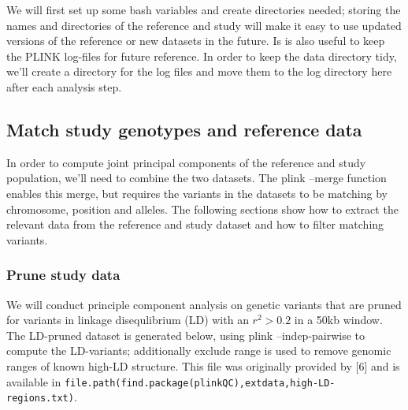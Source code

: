 \documentclass[]{article}
\newenvironment{Shaded}{}{}
\newcommand{\StringTok}[1]{\textcolor[rgb]{0.25,0.44,0.63}{#1}}
\newcommand{\FunctionTok}[1]{\textcolor[rgb]{0.02,0.16,0.49}{#1}}
\newcommand{\VariableTok}[1]{\textcolor[rgb]{0.10,0.09,0.49}{#1}}
\newcommand{\NormalTok}[1]{#1}
\begin{document}
We will first set up some bash variables and create directories needed;
storing the names and directories of the reference and study will make
it easy to use updated versions of the reference or new datasets in the
future. Is is also useful to keep the PLINK log-files for future
reference. In order to keep the data directory tidy, we'll create a
directory for the log files and move them to the log directory here
after each analysis step.

\begin{Shaded}
\end{Shaded}

\subsection{Match study genotypes and reference
data}\label{match-study-genotypes-and-reference-data}

In order to compute joint principal components of the reference and
study population, we'll need to combine the two datasets. The plink
--merge function enables this merge, but requires the variants in the
datasets to be matching by chromosome, position and alleles. The
following sections show how to extract the relevant data from the
reference and study dataset and how to filter matching variants.

\subsubsection{Prune study data}\label{prune-study-data}

We will conduct principle component analysis on genetic variants that
are pruned for variants in linkage disequlibrium (LD) with an
\(r^2 >0.2\) in a 50kb window. The LD-pruned dataset is generated below,
using plink --indep-pairwise to compute the LD-variants; additionally
exclude range is used to remove genomic ranges of known high-LD
structure. This file was originally provided by {[}6{]} and is available
in
\texttt{file.path(find.package(\textquotesingle{}plinkQC\textquotesingle{}),\textquotesingle{}extdata\textquotesingle{},\textquotesingle{}high-LD-regions.txt\textquotesingle{})}.
\end{document}
